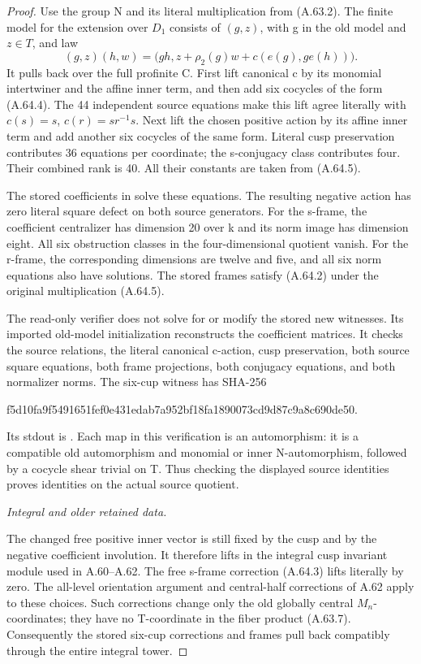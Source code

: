 \begin{proof}
Use the group N and its literal multiplication from (A.63.2).
The finite model for the extension over \(D_1\) consists of
\((g,z)\), with g in the old model and \(z\in T\), and law
\[
 (g,z)(h,w)=
 \bigl(gh,z+\rho_2(g)w+c(e(g),g e(h))\bigr).
 \tag{A.64.5}
\]
It pulls back over the full profinite C. First lift canonical c by
its monomial intertwiner and the affine inner term, and then add
six cocycles of the form (A.64.4). The 44 independent source
equations make this lift agree literally with
\(c(s)=s\), \(c(r)=sr^{-1}s\). Next lift the chosen positive
action by its affine inner term and add another six cocycles of
the same form. Literal cusp preservation contributes 36 equations
per coordinate; the s-conjugacy class contributes four. Their
combined rank is 40. All their constants are taken from (A.64.5).

The stored coefficients in
solve these equations. The resulting negative action has zero
literal square defect on both source generators. For the s-frame,
the coefficient centralizer has dimension 20 over k and its norm
image has dimension eight. All six obstruction classes in the
four-dimensional quotient vanish. For the r-frame, the corresponding
dimensions are twelve and five, and all six norm equations also
have solutions. The stored frames satisfy (A.64.2) under the
original multiplication (A.64.5).

The read-only verifier
does not solve for or modify the stored new witnesses. Its imported
old-model initialization reconstructs the coefficient matrices.
It checks the
source relations, the literal canonical c-action, cusp preservation,
both source square equations, both frame projections, both
conjugacy equations, and both normalizer norms. The six-cup witness
has SHA-256
\begin{center}\small\ttfamily
f5d10fa9f5491651fef0e431edab7a952bf18fa1890073cd9d87c9a8c690de50.
\end{center}
Its stdout is .
Each map in this verification is an automorphism: it is a compatible
old automorphism and monomial or inner N-automorphism, followed
by a cocycle shear trivial on T. Thus checking the displayed source
identities proves identities on the actual source quotient.

\emph{Integral and older retained data.}\par
The changed free positive inner vector is still fixed by the cusp
and by the negative coefficient involution. It therefore lifts in
the integral cusp invariant module used in A.60--A.62. The free
s-frame correction (A.64.3) lifts literally by zero. The all-level
orientation argument and central-half corrections of A.62 apply
to these choices. Such corrections change only the old globally
central \(M_n\)-coordinates; they have no T-coordinate in the
fiber product (A.63.7). Consequently the stored six-cup corrections
and frames pull back compatibly through the entire integral tower.


\end{proof}
